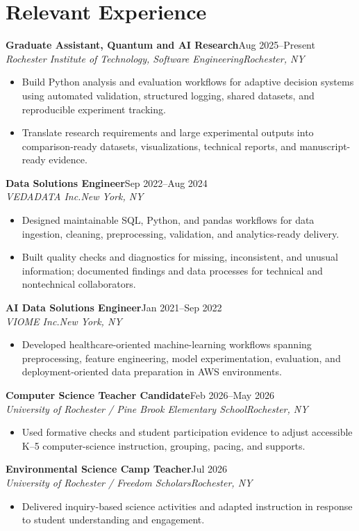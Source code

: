 \documentclass[10pt,letterpaper]{article}
\newcommand{\role}[4]{%
  \textbf{#1}\hfill #2\\
  \textit{#3}\hfill \textit{#4}\vspace{-3pt}
}
\begin{document}
\section*{Relevant Experience}
\role{Graduate Assistant, Quantum and AI Research}{Aug 2025--Present}
{Rochester Institute of Technology, Software Engineering}{Rochester, NY}
\begin{itemize}
  \item Build Python analysis and evaluation workflows for adaptive decision
    systems using automated validation, structured logging, shared datasets,
    and reproducible experiment tracking.
  \item Translate research requirements and large experimental outputs into
    comparison-ready datasets, visualizations, technical reports, and
    manuscript-ready evidence.
\end{itemize}

\role{Data Solutions Engineer}{Sep 2022--Aug 2024}
{VEDADATA Inc.}{New York, NY}
\begin{itemize}
  \item Designed maintainable SQL, Python, and pandas workflows for data
    ingestion, cleaning, preprocessing, validation, and analytics-ready delivery.
  \item Built quality checks and diagnostics for missing, inconsistent, and
    unusual information; documented findings and data processes for technical
    and nontechnical collaborators.
\end{itemize}

\role{AI Data Solutions Engineer}{Jan 2021--Sep 2022}
{VIOME Inc.}{New York, NY}
\begin{itemize}
  \item Developed healthcare-oriented machine-learning workflows spanning
    preprocessing, feature engineering, model experimentation, evaluation,
    and deployment-oriented data preparation in AWS environments.
\end{itemize}

\role{Computer Science Teacher Candidate}{Feb 2026--May 2026}
{University of Rochester / Pine Brook Elementary School}{Rochester, NY}
\begin{itemize}
  \item Used formative checks and student participation evidence to adjust
    accessible K--5 computer-science instruction, grouping, pacing, and supports.
\end{itemize}

\role{Environmental Science Camp Teacher}{Jul 2026}
{University of Rochester / Freedom Scholars}{Rochester, NY}
\begin{itemize}
  \item Delivered inquiry-based science activities and adapted instruction in
    response to student understanding and engagement.
\end{itemize}
\end{document}

